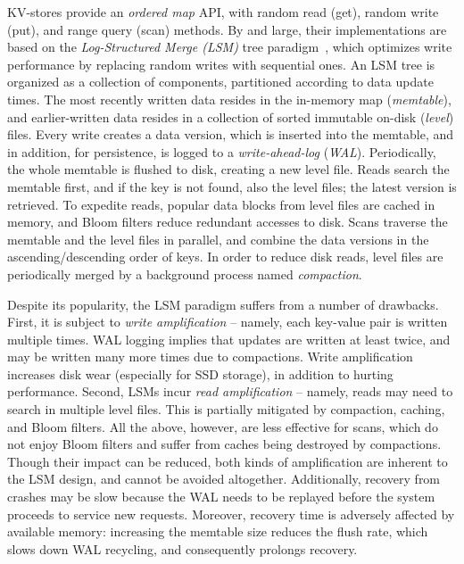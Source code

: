 KV-stores provide an {\em ordered map\/} API, with random read (get), random write (put), and range query 
(scan) methods. By and large, their implementations are based on the \emph{Log-Structured Merge (LSM)} 
tree paradigm~\cite{LSM}, which optimizes write performance by replacing random writes with sequential ones. 
An LSM tree is organized as a collection of components, partitioned according to data update times. 
The most recently written data resides in the in-memory map ({\em memtable\/}), and earlier-written data 
resides in a collection of sorted immutable on-disk ({\em level}) files. Every write creates a  data version, 
which is inserted into the memtable, and in addition, for persistence, is logged to a \emph{write-ahead-log} ({\em WAL}). Periodically, the whole memtable is flushed to disk, creating a new level file. Reads search the memtable first,
and if the key is not found, also the level files; the latest version is retrieved. To expedite reads, popular data blocks 
from level files are cached in memory, and Bloom filters reduce redundant accesses to disk. Scans traverse the 
memtable and the level files in parallel, and combine the data versions in the ascending/descending order of keys. 
In order to reduce disk reads, level files are periodically merged by a background process named \emph{compaction}.
 
Despite its popularity, the LSM paradigm suffers from a number of drawbacks. 
First, it is subject to \emph{write amplification} -- namely, each key-value pair is written multiple times. 
WAL logging implies that updates are written at least twice, and may be written many more times due 
to compactions. Write amplification increases disk wear (especially for SSD storage), in addition to hurting 
performance. Second, LSMs incur \emph{read amplification} -- namely, reads may need 
to search in multiple level files. This is partially mitigated by compaction, caching, and Bloom filters. 
All the above, however, are less effective for scans, which do not enjoy Bloom filters and suffer from 
caches being destroyed by compactions.  Though their impact can be reduced, both kinds of amplification 
are inherent to the LSM design, and cannot be avoided altogether. Additionally, recovery from crashes 
may be slow because the WAL needs to be replayed before the system proceeds to service new requests.  
Moreover, recovery time is adversely affected by available memory: increasing the memtable size 
reduces the flush rate, which slows down WAL recycling, and consequently prolongs recovery. 

